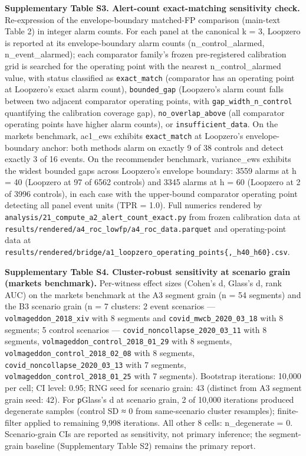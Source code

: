 \documentclass[
  11pt,
]{article}
\begin{document}
\textbf{Supplementary Table S3. Alert-count exact-matching sensitivity
check.} Re-expression of the envelope-boundary matched-FP comparison
(main-text Table 2) in integer alarm counts. For each panel at the
canonical k = 3, Loopzero is reported at its envelope-boundary alarm
counts (n\_control\_alarmed, n\_event\_alarmed); each comparator
family's frozen pre-registered calibration grid is searched for the
operating point with the nearest n\_control\_alarmed value, with status
classified as \texttt{exact\_match} (comparator has an operating point
at Loopzero's exact alarm count), \texttt{bounded\_gap} (Loopzero's
alarm count falls between two adjacent comparator operating points, with
\texttt{gap\_width\_n\_control} quantifying the calibration coverage
gap), \texttt{no\_overlap\_above} (all comparator operating points have
higher alarm counts), or \texttt{insufficient\_data}. On the markets
benchmark, ac1\_ews exhibits \texttt{exact\_match} at Loopzero's
envelope-boundary anchor: both methods alarm on exactly 9 of 38 controls
and detect exactly 3 of 16 events. On the recommender benchmark,
variance\_ews exhibits the widest bounded gaps across Loopzero's
envelope boundary: 3559 alarms at h = 40 (Loopzero at 97 of 6562
controls) and 3345 alarms at h = 60 (Loopzero at 2 of 3996 controls), in
each case with the upper-bound comparator operating point detecting all
panel event units (TPR = 1.0). Full numerics rendered by
\texttt{analysis/21\_compute\_a2\_alert\_count\_exact.py} from frozen
calibration data at
\texttt{results/rendered/a4\_roc\_lowfp/a4\_roc\_data.parquet} and
operating-point data at
\texttt{results/rendered/bridge/a1\_loopzero\_operating\_points\{,\_h40\_h60\}.csv}.

\textbf{Supplementary Table S4. Cluster-robust sensitivity at scenario
grain (markets benchmark).} Per-witness effect sizes (Cohen's d, Glass's
d, rank AUC) on the markets benchmark at the A3 segment grain (n = 54
segments) and the B3 scenario grain (n = 7 clusters: 2 event scenarios
--- \texttt{volmageddon\_2018\_xiv} with 8 segments and
\texttt{covid\_mwcb\_2020\_03\_18} with 8 segments; 5 control scenarios
--- \texttt{covid\_noncollapse\_2020\_03\_11} with 8 segments,
\texttt{volmageddon\_control\_2018\_01\_29} with 8 segments,
\texttt{volmageddon\_control\_2018\_02\_08} with 8 segments,
\texttt{covid\_noncollapse\_2020\_03\_13} with 7 segments,
\texttt{volmageddon\_control\_2018\_01\_25} with 7 segments). Bootstrap
iterations: 10,000 per cell; CI level: 0.95; RNG seed for scenario
grain: 43 (distinct from A3 segment grain seed: 42). For
\texttt{p}\textbar Glass's d at scenario grain, 2 of 10,000 iterations
produced degenerate samples (control SD ≈ 0 from same-scenario cluster
resamples); finite-filter applied to remaining 9,998 iterations. All
other 8 cells: n\_degenerate = 0. Scenario-grain CIs are reported as
sensitivity, not primary inference; the segment-grain baseline
(Supplementary Table S2) remains the primary report.
\end{document}

